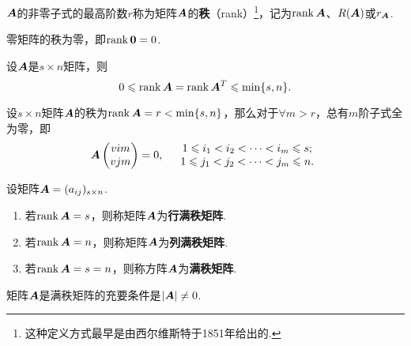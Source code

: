 \begin{definition}\label{definition:线性方程组.矩阵的秩的定义}
\(\boldsymbol{A}\)的非零子式的最高阶数\(r\)称为矩阵\(\boldsymbol{A}\)的\textbf{秩}（rank）\footnote{这种定义方式最早是由西尔维斯特于1851年给出的.}，记为\(\rank\boldsymbol{A}\)、\(R(\boldsymbol{A})\)或\(r_{\boldsymbol{A}}\).
\end{definition}

\begin{property}\label{theorem:线性方程组.矩阵的秩的性质1}
零矩阵的秩为零，即\(\rank\boldsymbol{0} = 0\).
\end{property}

\begin{property}\label{theorem:线性方程组.矩阵的秩的性质2}
设\(\boldsymbol{A}\)是\(s \times n\)矩阵，则\[
0 \leqslant \rank\boldsymbol{A} = \rank\boldsymbol{A}^T \leqslant \min\{s,n\}.
\]
\end{property}

\begin{property}\label{theorem:线性方程组.矩阵的秩的性质3}
设\(s \times n\)矩阵\(\boldsymbol{A}\)的秩为\(\rank\boldsymbol{A} = r < \min\{s,n\}\)，那么对于\(\forall m > r\)，总有\(m\)阶子式全为零，即\[
\boldsymbol{A}\begin{pmatrix}
v{i}{m} \\
v{j}{m}
\end{pmatrix} = 0,
\quad\begin{array}{c}
1 \leqslant i_1 < i_2 < \dotsb < i_m \leqslant s; \\
1 \leqslant j_1 < j_2 < \dotsb < j_m \leqslant n.
\end{array}
\]
\end{property}

\begin{definition}
设矩阵\(\boldsymbol{A} = (a_{ij})_{s \times n}\).\begin{enumerate}
\item 若\(\rank\boldsymbol{A} = s\)，则称矩阵\(\boldsymbol{A}\)为\textbf{行满秩矩阵}.
\item 若\(\rank\boldsymbol{A} = n\)，则称矩阵\(\boldsymbol{A}\)为\textbf{列满秩矩阵}.
\item 若\(\rank\boldsymbol{A} = s = n\)，则称方阵\(\boldsymbol{A}\)为\textbf{满秩矩阵}.
\end{enumerate}
\end{definition}

\begin{property}\label{theorem:线性方程组.矩阵的秩的性质4}
矩阵\(\boldsymbol{A}\)是满秩矩阵的充要条件是\(\abs{\boldsymbol{A}}\neq0\).
\end{property}

